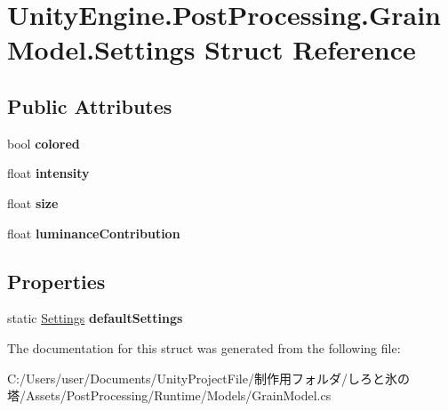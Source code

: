 \hypertarget{struct_unity_engine_1_1_post_processing_1_1_grain_model_1_1_settings}{}\section{Unity\+Engine.\+Post\+Processing.\+Grain\+Model.\+Settings Struct Reference}
\label{struct_unity_engine_1_1_post_processing_1_1_grain_model_1_1_settings}
\subsection*{Public Attributes}
\begin{DoxyCompactItemize}
\item 
\mbox{\label{struct_unity_engine_1_1_post_processing_1_1_grain_model_1_1_settings_aad04a9e0e2a4e76a4d039aef0b510dd7}} 
bool {\bfseries colored}
\item 
\mbox{\label{struct_unity_engine_1_1_post_processing_1_1_grain_model_1_1_settings_ae696f9b4163df03b17d1f1d824ece3e2}} 
float {\bfseries intensity}
\item 
\mbox{\label{struct_unity_engine_1_1_post_processing_1_1_grain_model_1_1_settings_a781cd0e3020f79f79b17e17ebb2bca57}} 
float {\bfseries size}
\item 
\mbox{\label{struct_unity_engine_1_1_post_processing_1_1_grain_model_1_1_settings_ac063b9210d784f1f79192e23a945cfed}} 
float {\bfseries luminance\+Contribution}
\end{DoxyCompactItemize}
\subsection*{Properties}
\begin{DoxyCompactItemize}
\item 
\mbox{\label{struct_unity_engine_1_1_post_processing_1_1_grain_model_1_1_settings_a8df6cd9a36238511c92646fe1b9e86bc}} 
static \hyperlink{struct_unity_engine_1_1_post_processing_1_1_grain_model_1_1_settings}{Settings} {\bfseries default\+Settings}
\end{DoxyCompactItemize}


The documentation for this struct was generated from the following file\+:\begin{DoxyCompactItemize}
\item 
C\+:/\+Users/user/\+Documents/\+Unity\+Project\+File/制作用フォルダ/しろと氷の塔/\+Assets/\+Post\+Processing/\+Runtime/\+Models/Grain\+Model.\+cs\end{DoxyCompactItemize}
